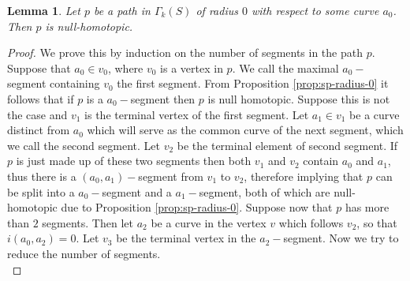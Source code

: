 \documentclass[11pt]{article}
\newtheorem{lemma}[theorem]{Lemma}
\begin{document}
\begin{lemma}\label{lem:radius-zero}
  Let $p$ be a path in $\Gamma_k(S)$ of radius $0$ with respect to some curve $a_0$. Then $p$ is null-homotopic.
\end{lemma}
\begin{proof}
  We prove this by induction on the number of segments in the path $p$. Suppose that $a_0\in v_0$, where $v_0$ is a vertex in $p$. We call the maximal $a_0-$segment containing $v_0$ the first segment. From Proposition \ref{prop:sp-radius-0} it follows that if $p$ is a $a_0-$segment then $p$ is null homotopic. Suppose this is not the case and $v_1$ is the terminal vertex of the first segment. Let $a_1\in v_1$ be a curve distinct from $a_0$ which will serve as the common curve of the next segment, which we call the second segment. Let $v_2$ be the terminal element of second segment. If $p$ is just made up of these two segments then both $v_1$ and $v_2$ contain $a_0$ and $a_1$, thus there is a $(a_0, a_1)-$segment from $v_1$ to $v_2$, therefore implying that $p$ can be split into a $a_0-$segment and a $a_1-$segment, both of which are null-homotopic due to Proposition \ref{prop:sp-radius-0}. Suppose now that $p$ has more than $2$ segments. Then let $a_2$ be a curve in the vertex $v$ which follows $v_2$, so that $i(a_0, a_2)=0$. Let $v_3$ be the terminal vertex in the $a_2-$segment. Now we try to reduce the number of segments.\\


\end{proof}
\end{document}
